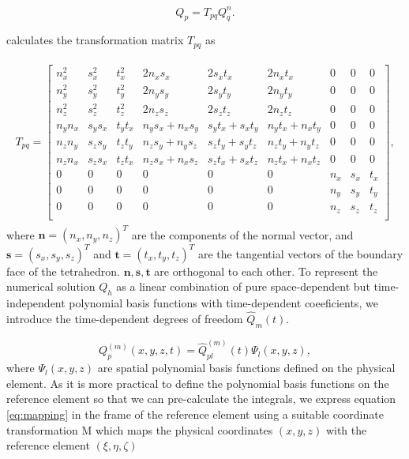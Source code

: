 \begin{equation}
    Q_p = T_{pq}Q_q^n .
\end{equation}

\parencite{dumbser1} calculates the transformation matrix $T_{pq}$ as

\begin{align}
    \begin{split}
    T_{pq} = 
        \begin{bmatrix}
        n_x^2 & s_x^2 & t_x^2 & 2n_x s_x & 2s_x t_x & 2n_x t_x & 0 & 0 & 0 \\
        n_y^2 & s_y^2 & t_y^2 & 2n_y s_y & 2s_y t_y & 2n_y t_y & 0 & 0 & 0 \\
        n_z^2 & s_z^2 & t_z^2 & 2n_z s_z & 2s_z t_z & 2n_z t_z & 0 & 0 & 0 \\
        n_y n_x & s_y s_x & t_y t_x & n_y s_x + n_x s_y & s_y t_x + s_x t_y & n_y t_x + n_x t_y & 0 & 0 & 0 \\
        n_z n_y & s_z s_y & t_z t_y & n_z s_y + n_y s_z & s_z t_y + s_y t_z & n_z t_y + n_y t_z & 0 & 0 & 0 \\
        n_z n_x & s_z s_x & t_z t_x & n_z s_x + n_x s_z & s_z t_x + s_x t_z & n_z t_x + n_x t_z & 0 & 0 & 0 \\
        0 & 0 & 0 & 0 & 0 & 0 & n_x & s_x & t_x \\
        0 & 0 & 0 & 0 & 0 & 0 & n_y & s_y & t_y \\
        0 & 0 & 0 & 0 & 0 & 0 & n_z & s_z & t_z \\
    \end{bmatrix},
    \end{split}
\end{align}
where $\mathbf{n} = \left(n_x, n_y, n_z\right)^T$ are the components of the normal vector, and $\mathbf{s} = \left(s_x, s_y, s_z\right)^T$ and
$\mathbf{t} = \left(t_x, t_y, t_z\right)^T$ are the tangential vectors of the boundary face of the tetrahedron. $\mathbf{n}, \mathbf{s}, \mathbf{t}$
are orthogonal to each other. To represent the numerical solution $Q_h$ as a linear combination of pure space-dependent but time-independent polynomial basis
functions with time-dependent coeeficients, we introduce the time-dependent degrees of freedom $\hat{Q}_m\left(t\right)$.

\begin{equation}
    Q_p^{\left(m\right)} \left(x,y,z,t\right) = \hat{Q}_{pl}^{\left(m\right)} \left(t\right) \Psi_l \left(x, y, z\right),
    \label{eq:mapping}
\end{equation}
where $\Psi_l\left(x,y,z\right)$ are spatial polynomial basis functions defined on the physical element. As it is more practical to define the polynomial 
basis functions on the reference element so that we can pre-calculate the integrals, we express equation \ref{eq:mapping} in 
the frame of the reference element using a suitable coordinate transformation M which maps the physical coordinates $\left(x, y, z\right)$ with the reference element $\left(\xi, \eta, \zeta\right)$

